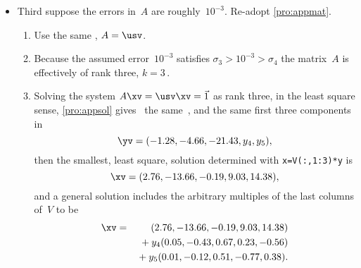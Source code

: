 \begin{example}
\begin{solution}
\begin{itemize}
\item Third suppose the errors in~\(A\) are roughly~\(10^{-3}\).
Re-adopt \autoref{pro:appmat}.
\begin{enumerate}
\item Use the same \svd, \(A=\usv\).
\item Because the assumed error~\(10^{-3}\) satisfies \(\sigma_3>10^{-3}>\sigma_4\) the matrix~\(A\) is effectively of rank three, \(k=3\)\,.
\item Solving the system \(A\xv=\usv\xv=\vec1\) as rank three, in the least square sense, \autoref{pro:appsol} gives \twodp\ the same~\zv, and the same first three components in
\begin{equation*}
\yv=(-1.28,-4.66,-21.43,y_4,y_5),
\end{equation*}
then the smallest, least square, solution determined with 
\verb|x=V(:,1:3)*y| is
\begin{equation*}
\xv=(2.76,-13.66,-0.19,9.03,14.38),
\end{equation*}
and a general solution includes the arbitrary multiples of the last columns of~\(V\) to be
\begin{eqnarray*}
\xv&=&(2.76,-13.66,-0.19,9.03,14.38)
\\&&{}+y_4(0.05,-0.43,0.67,0.23,-0.56)
\\&&{}+y_5(0.01,-0.12,0.51,-0.77,0.38).
\end{eqnarray*}
\end{enumerate}


\end{itemize}
\end{solution}
\end{example}
